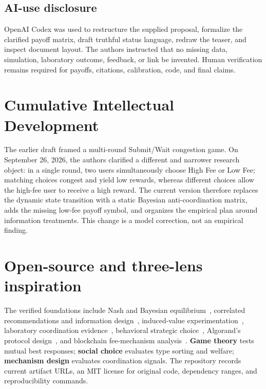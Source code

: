 \subsection{AI-use disclosure}
OpenAI Codex was used to restructure the supplied proposal, formalize the clarified payoff matrix, draft truthful status language, redraw the teaser, and inspect document layout. The authors instructed that no missing data, simulation, laboratory outcome, feedback, or link be invented. Human verification remains required for payoffs, citations, calibration, code, and final claims.

\section{Cumulative Intellectual Development}
The earlier draft framed a multi-round Submit/Wait congestion game. On September 26, 2026, the authors clarified a different and narrower research object: in a single round, two users simultaneously choose High Fee or Low Fee; matching choices congest and yield low rewards, whereas different choices allow the high-fee user to receive a high reward. The current version therefore replaces the dynamic state transition with a static Bayesian anti-coordination matrix, adds the missing low-fee payoff symbol, and organizes the empirical plan around information treatments. This change is a model correction, not an empirical finding.

\section{Open-source and three-lens inspiration}
The verified foundations include Nash and Bayesian equilibrium~\cite{nash1950,harsanyi1968}, correlated recommendations and information design~\cite{aumann1974,bergemann2016}, induced-value experimentation~\cite{smith1976}, laboratory coordination evidence~\cite{vanhuyck1990,crawford2008,agranov2012}, behavioral strategic choice~\cite{camerer2003,zhu2025}, Algorand's protocol design~\cite{gilad2017}, and blockchain fee-mechanism analysis~\cite{roughgarden2024}. \textbf{Game theory} tests mutual best responses; \textbf{social choice} evaluates type sorting and welfare; \textbf{mechanism design} evaluates coordination signals. The repository records current artifact URLs, an MIT license for original code, dependency ranges, and reproducibility commands.

